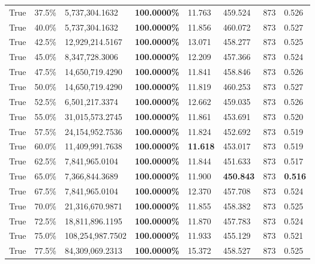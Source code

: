 \begin{table}[H]
{\begin{tabular}{lllrllll}
\cline{1-8}
True & 37.5\% & 5,737,304.1632 & \bfseries \color{red} 100.0000\% & 11.763 & 459.524 & 873 & 0.526 \\
\cline{1-8}
True & 40.0\% & 5,737,304.1632 & \bfseries \color{red} 100.0000\% & 11.856 & 460.072 & 873 & 0.527 \\
\cline{1-8}
True & 42.5\% & 12,929,214.5167 & \bfseries \color{red} 100.0000\% & 13.071 & 458.277 & 873 & 0.525 \\
\cline{1-8}
True & 45.0\% & 8,347,728.3006 & \bfseries \color{red} 100.0000\% & 12.209 & 457.366 & 873 & 0.524 \\
\cline{1-8}
True & 47.5\% & 14,650,719.4290 & \bfseries \color{red} 100.0000\% & 11.841 & 458.846 & 873 & 0.526 \\
\cline{1-8}
True & 50.0\% & 14,650,719.4290 & \bfseries \color{red} 100.0000\% & 11.819 & 460.253 & 873 & 0.527 \\
\cline{1-8}
True & 52.5\% & 6,501,217.3374 & \bfseries \color{red} 100.0000\% & 12.662 & 459.035 & 873 & 0.526 \\
\cline{1-8}
True & 55.0\% & 31,015,573.2745 & \bfseries \color{red} 100.0000\% & 11.861 & 453.691 & 873 & 0.520 \\
\cline{1-8}
True & 57.5\% & 24,154,952.7536 & \bfseries \color{red} 100.0000\% & 11.824 & 452.692 & 873 & 0.519 \\
\cline{1-8}
True & 60.0\% & 11,409,991.7638 & \bfseries \color{red} 100.0000\% & \bfseries \color{red} 11.618 & 453.017 & 873 & 0.519 \\
\cline{1-8}
True & 62.5\% & 7,841,965.0104 & \bfseries \color{red} 100.0000\% & 11.844 & 451.633 & 873 & 0.517 \\
\cline{1-8}
True & 65.0\% & 7,366,844.3689 & \bfseries \color{red} 100.0000\% & 11.900 & \bfseries \color{red} 450.843 & 873 & \bfseries \color{red} 0.516 \\
\cline{1-8}
True & 67.5\% & 7,841,965.0104 & \bfseries \color{red} 100.0000\% & 12.370 & 457.708 & 873 & 0.524 \\
\cline{1-8}
True & 70.0\% & 21,316,670.9871 & \bfseries \color{red} 100.0000\% & 11.855 & 458.382 & 873 & 0.525 \\
\cline{1-8}
True & 72.5\% & 18,811,896.1195 & \bfseries \color{red} 100.0000\% & 11.870 & 457.783 & 873 & 0.524 \\
\cline{1-8}
True & 75.0\% & 108,254,987.7502 & \bfseries \color{red} 100.0000\% & 11.933 & 455.129 & 873 & 0.521 \\
\cline{1-8}
True & 77.5\% & 84,309,069.2313 & \bfseries \color{red} 100.0000\% & 15.372 & 458.527 & 873 & 0.525 \\

\end{tabular}}
\end{table}
